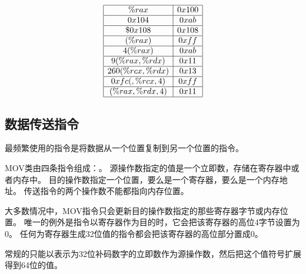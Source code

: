 {{        %
        \begin{practicec}
            \begin{table}[H]
                \[
                    \begin{array}{|c|c|}
                        \hline
                        \%rax & 0x100 \\
                        \hline
                        0x104 & 0xab \\
                        \hline
                        \$0x108 & 0x108 \\
                        \hline
                        (\%rax) & 0xff \\
                        \hline
                        4(\%rax) & 0xab \\
                        \hline
                        9(\%rax, \%rdx) & 0x11 \\
                        \hline
                        260(\%rcx, \%rdx) & 0x13 \\
                        \hline
                        0xfc(, \%rcx, 4) & 0xff \\
                        \hline
                        (\%rax, \%rdx, 4) & 0x11 \\
                        \hline
                    \end{array}
                \]
            \end{table}
        \end{practicec}
    }

    \subsection{数据传送指令}
    {
        最频繁使用的指令是将数据从一个位置复制到另一个位置的指令。

        MOV类由四条指令组成：。
        源操作数指定的值是一个立即数，存储在寄存器中或者内存中。
        目的操作数指定一个位置，要么是一个寄存器，要么是一个内存地址。
        传送指令的两个操作数不能都指向内存位置。

        大多数情况中，MOV指令只会更新目的操作数指定的那些寄存器字节或内存位置。
        唯一的例外是指令以寄存器作为目的时，它会把该寄存器的高位4字节设置为0。
        任何为寄存器生成32位值的指令都会把该寄存器的高位部分置成0。

        常规的只能以表示为32位补码数字的立即数作为源操作数，然后把这个值符号扩展得到64位的值。
    }
}
